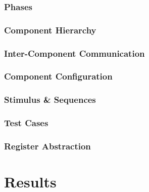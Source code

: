 \documentclass[12pt]{report}
\begin{document}
\subsection{Phases} %

\subsection{Component Hierarchy} %

\subsection{Inter-Component Communication} %

\subsection{Component Configuration} %

\subsection{Stimulus \& Sequences} %

\subsection{Test Cases} %

\subsection{Register Abstraction} %

\chapter{Results} %
\end{document}
